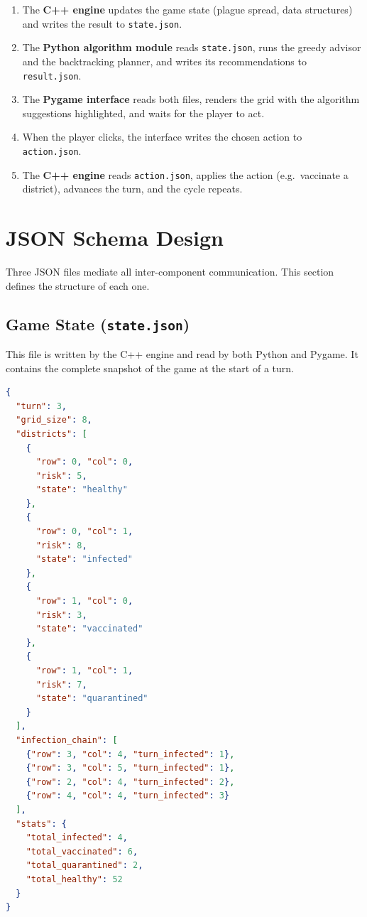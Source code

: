 \documentclass[conference]{IEEEtran}
\begin{document}
\begin{enumerate}
    \item The \textbf{C++ engine} updates the game state (plague spread, data
          structures) and writes the result to \texttt{state.json}.
    \item The \textbf{Python algorithm module} reads \texttt{state.json}, runs
          the greedy advisor and the backtracking planner, and writes its
          recommendations to \texttt{result.json}.
    \item The \textbf{Pygame interface} reads both files, renders the grid with
          the algorithm suggestions highlighted, and waits for the player to
          act.
    \item When the player clicks, the interface writes the chosen action to
          \texttt{action.json}.
    \item The \textbf{C++ engine} reads \texttt{action.json}, applies the
          action (e.g.\ vaccinate a district), advances the turn, and the
          cycle repeats.
\end{enumerate}

\section{JSON Schema Design}

Three JSON files mediate all inter-component communication. This section
defines the structure of each one.

\subsection{Game State (\texttt{state.json})}

This file is written by the C++ engine and read by both Python and Pygame. It
contains the complete snapshot of the game at the start of a turn.

\begin{lstlisting}[language=json, frame=single,
  caption={Example \texttt{state.json} (turn 3).},
  label={lst:state}]
{
  "turn": 3,
  "grid_size": 8,
  "districts": [
    {
      "row": 0, "col": 0,
      "risk": 5,
      "state": "healthy"
    },
    {
      "row": 0, "col": 1,
      "risk": 8,
      "state": "infected"
    },
    {
      "row": 1, "col": 0,
      "risk": 3,
      "state": "vaccinated"
    },
    {
      "row": 1, "col": 1,
      "risk": 7,
      "state": "quarantined"
    }
  ],
  "infection_chain": [
    {"row": 3, "col": 4, "turn_infected": 1},
    {"row": 3, "col": 5, "turn_infected": 1},
    {"row": 2, "col": 4, "turn_infected": 2},
    {"row": 4, "col": 4, "turn_infected": 3}
  ],
  "stats": {
    "total_infected": 4,
    "total_vaccinated": 6,
    "total_quarantined": 2,
    "total_healthy": 52
  }
}
\end{lstlisting}
\end{document}

